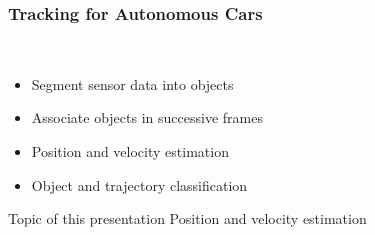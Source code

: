 \begin{frame}
  \frametitle{Tracking for Autonomous Cars}
  \begin{description}[]
  \item[Subtasks of Tracking] \hfill \\
  \begin{itemize}
  \item Segment sensor data into objects
  \item Associate objects in successive frames
  \item Position and velocity estimation
  \item Object and trajectory classification
  \end{itemize}
  \end{description}
  \pause
  \begin{block}{Topic of this presentation}
    Position and velocity estimation
  \end{block}
\end{frame}

